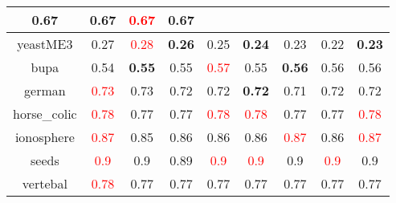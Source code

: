 \documentclass{article}%
\begin{document}
\begin{tabular}{c|cccccccc}
{0.67
}&0.67&\textcolor{red}{ 
0.67
}&0.67\\%
\hline%
yeastME3&0.27&\textcolor{red}{ 
0.28
}&\textbf{0.26}&0.25&\textbf{0.24}&0.23&0.22&\textbf{0.23}\\%
\hline%
bupa&0.54&\textbf{0.55}&0.55&\textcolor{red}{ 
0.57
}&0.55&\textbf{0.56}&0.56&0.56\\%
\hline%
german&\textcolor{red}{ 
0.73
}&0.73&0.72&0.72&\textbf{0.72}&0.71&0.72&0.72\\%
\hline%
horse\_colic&\textcolor{red}{ 
0.78
}&0.77&0.77&\textcolor{red}{ 
0.78
}&\textcolor{red}{ 
0.78
}&0.77&0.77&\textcolor{red}{ 
0.78
}\\%
\hline%
ionosphere&\textcolor{red}{ 
0.87
}&0.85&0.86&0.86&0.86&\textcolor{red}{ 
0.87
}&0.86&\textcolor{red}{ 
0.87
}\\%
\hline%
seeds&\textcolor{red}{ 
0.9
}&0.9&0.89&\textcolor{red}{ 
0.9
}&\textcolor{red}{ 
0.9
}&0.9&\textcolor{red}{ 
0.9
}&0.9\\%
\hline%
vertebal&\textcolor{red}{ 
0.78
}&0.77&0.77&0.77&0.77&0.77&0.77&0.77\\%
\hline%
\end{tabular}

%
\end{document}
